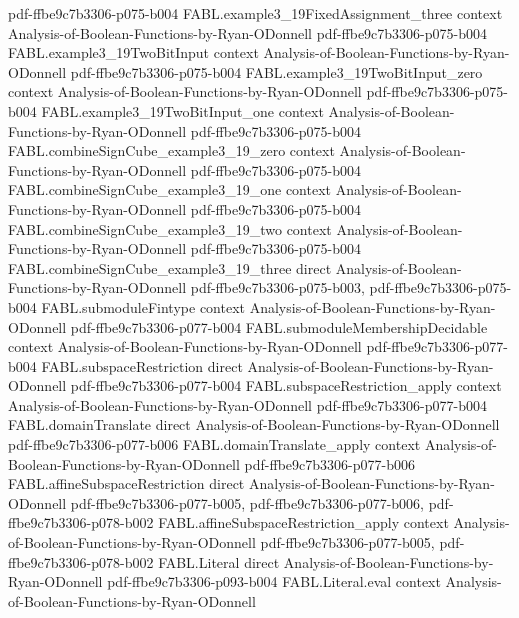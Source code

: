 \begin{theorem}
  {pdf-ffbe9c7b3306-p075-b004}
\proofstep
  {FABL.example3_19FixedAssignment_three}
  {context}
  {Analysis-of-Boolean-Functions-by-Ryan-ODonnell}
  {pdf-ffbe9c7b3306-p075-b004}
\proofstep
  {FABL.example3_19TwoBitInput}
  {context}
  {Analysis-of-Boolean-Functions-by-Ryan-ODonnell}
  {pdf-ffbe9c7b3306-p075-b004}
\proofstep
  {FABL.example3_19TwoBitInput_zero}
  {context}
  {Analysis-of-Boolean-Functions-by-Ryan-ODonnell}
  {pdf-ffbe9c7b3306-p075-b004}
\proofstep
  {FABL.example3_19TwoBitInput_one}
  {context}
  {Analysis-of-Boolean-Functions-by-Ryan-ODonnell}
  {pdf-ffbe9c7b3306-p075-b004}
\proofstep
  {FABL.combineSignCube_example3_19_zero}
  {context}
  {Analysis-of-Boolean-Functions-by-Ryan-ODonnell}
  {pdf-ffbe9c7b3306-p075-b004}
\proofstep
  {FABL.combineSignCube_example3_19_one}
  {context}
  {Analysis-of-Boolean-Functions-by-Ryan-ODonnell}
  {pdf-ffbe9c7b3306-p075-b004}
\proofstep
  {FABL.combineSignCube_example3_19_two}
  {context}
  {Analysis-of-Boolean-Functions-by-Ryan-ODonnell}
  {pdf-ffbe9c7b3306-p075-b004}
\proofstep
  {FABL.combineSignCube_example3_19_three}
  {direct}
  {Analysis-of-Boolean-Functions-by-Ryan-ODonnell}
  {pdf-ffbe9c7b3306-p075-b003,
    pdf-ffbe9c7b3306-p075-b004}
\proofstep
  {FABL.submoduleFintype}
  {context}
  {Analysis-of-Boolean-Functions-by-Ryan-ODonnell}
  {pdf-ffbe9c7b3306-p077-b004}
\proofstep
  {FABL.submoduleMembershipDecidable}
  {context}
  {Analysis-of-Boolean-Functions-by-Ryan-ODonnell}
  {pdf-ffbe9c7b3306-p077-b004}
\proofstep
  {FABL.subspaceRestriction}
  {direct}
  {Analysis-of-Boolean-Functions-by-Ryan-ODonnell}
  {pdf-ffbe9c7b3306-p077-b004}
\proofstep
  {FABL.subspaceRestriction_apply}
  {context}
  {Analysis-of-Boolean-Functions-by-Ryan-ODonnell}
  {pdf-ffbe9c7b3306-p077-b004}
\proofstep
  {FABL.domainTranslate}
  {direct}
  {Analysis-of-Boolean-Functions-by-Ryan-ODonnell}
  {pdf-ffbe9c7b3306-p077-b006}
\proofstep
  {FABL.domainTranslate_apply}
  {context}
  {Analysis-of-Boolean-Functions-by-Ryan-ODonnell}
  {pdf-ffbe9c7b3306-p077-b006}
\proofstep
  {FABL.affineSubspaceRestriction}
  {direct}
  {Analysis-of-Boolean-Functions-by-Ryan-ODonnell}
  {pdf-ffbe9c7b3306-p077-b005,
    pdf-ffbe9c7b3306-p077-b006,
    pdf-ffbe9c7b3306-p078-b002}
\proofstep
  {FABL.affineSubspaceRestriction_apply}
  {context}
  {Analysis-of-Boolean-Functions-by-Ryan-ODonnell}
  {pdf-ffbe9c7b3306-p077-b005,
    pdf-ffbe9c7b3306-p078-b002}
\proofstep
  {FABL.Literal}
  {direct}
  {Analysis-of-Boolean-Functions-by-Ryan-ODonnell}
  {pdf-ffbe9c7b3306-p093-b004}
\proofstep
  {FABL.Literal.eval}
  {context}
  {Analysis-of-Boolean-Functions-by-Ryan-ODonnell}

\end{theorem}
